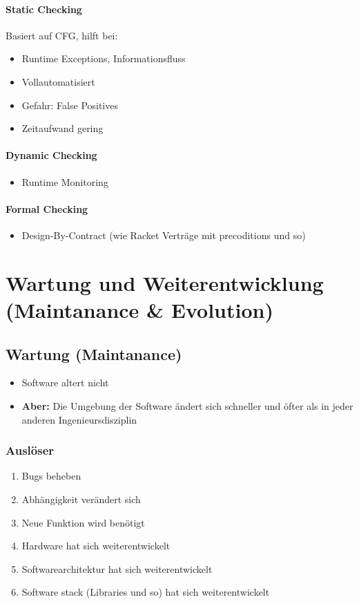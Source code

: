 \documentclass[
    ngerman,
    color=3b,
    summary,
    boxarc,
    main,
]{rubos-tuda-template}
\begin{document}
\paragraph{Static Checking}
Basiert auf CFG, hilft bei:
\begin{itemize}
    \item Runtime Exceptions, Informationsfluss
    \item Vollautomatisiert
    \item Gefahr: False Positives
    \item Zeitaufwand gering
\end{itemize}
\vspace*{-1ex}
\paragraph{Dynamic Checking}\begin{itemize}
    \item Runtime Monitoring
\end{itemize}
\vspace*{-1ex}
\paragraph{Formal Checking}\begin{itemize}
    \item Design-By-Contract (wie Racket Verträge mit precoditions und so)
\end{itemize}

\clearpage
\section{Wartung und Weiterentwicklung (Maintanance \& Evolution)}
\subsection{Wartung (Maintanance)}
\begin{itemize}
    \item Software altert nicht
    \item \textbf{Aber:} Die Umgebung der Software ändert sich schneller und öfter als in jeder anderen Ingenieursdisziplin
\end{itemize}
\subsubsection{Auslöser}
\begin{enumerate}
    \item Bugs beheben
    \item Abhängigkeit verändert sich
    \item Neue Funktion wird benötigt
    \item Hardware hat sich weiterentwickelt
    \item Softwarearchitektur hat sich weiterentwickelt
    \item Software stack (Libraries und so) hat sich weiterentwickelt
\end{enumerate}
\end{document}
